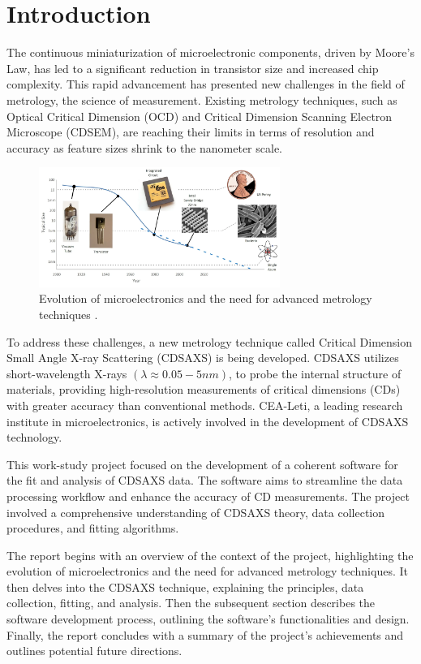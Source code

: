 \section{Introduction}

\medskip

The continuous miniaturization of microelectronic components, driven by Moore's Law, 
has led to a significant reduction in transistor size and increased chip complexity.
This rapid advancement has presented new challenges in the field of metrology, the science of measurement.
Existing metrology techniques, such as Optical Critical Dimension (OCD) and Critical Dimension Scanning 
Electron Microscope (CDSEM), are reaching their limits in terms of resolution and accuracy as feature sizes
shrink to the nanometer scale.


\begin{figure}[h]
    \centering
    \includegraphics[width=0.7\textwidth]{images/moore's_law.png}
    \caption{Evolution of microelectronics and the need for advanced metrology techniques \cite{moore_law}.}
    \label{fig:evolution_microelectronics}
\end{figure}

\FloatBarrier

To address these challenges, a new metrology technique called Critical Dimension Small Angle X-ray Scattering
(CDSAXS) is being developed. CDSAXS utilizes short-wavelength X-rays $(\lambda \approx 0.05 - 5 nm)$, to probe the internal structure of
materials, providing high-resolution measurements of critical dimensions (CDs) with greater accuracy than
conventional methods. CEA-Leti, a leading research institute in microelectronics, is actively involved in
the development of CDSAXS technology.

\medskip

This work-study project focused on the development of a coherent software for the fit and analysis of CDSAXS
data. The software aims to streamline the data processing workflow and enhance the accuracy of CD measurements.
The project involved a comprehensive understanding of CDSAXS theory, data collection procedures, and fitting
algorithms.

\medskip

The report begins with an overview of the context of the project, highlighting the evolution of
microelectronics and the need for advanced metrology techniques. It then delves into the CDSAXS technique, 
explaining the principles, data collection, fitting, and analysis. Then the subsequent
section describes the software development process, outlining the software's functionalities and design. Finally, the report concludes with a summary of the project's achievements and
outlines potential future directions.